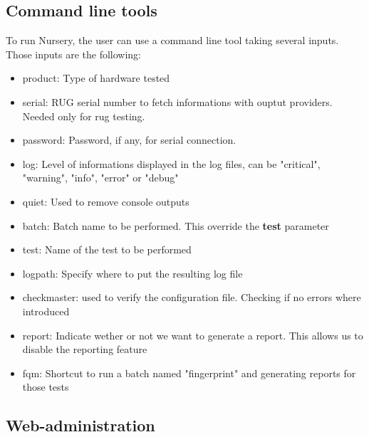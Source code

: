 \documentclass[12pt]{article}
\begin{document}
\subsection{Command line tools}

To run Nursery, the user can use a command line tool taking several inputs. Those inputs are the following:

\begin{itemize}
\item product: Type of hardware tested
\item serial: RUG serial number to fetch informations with ouptut providers. Needed only for \gls{rug} testing.
\item password: Password, if any, for serial connection.
\item log: Level of informations displayed in the log files, can be "critical", "warning", "info", "error" or "debug"
\item quiet: Used to remove console outputs
\item batch: Batch name to be performed. This override the \textbf{test} parameter
\item test: Name of the test to be performed
\item logpath: Specify where to put the resulting log file
\item checkmaster: used to verify the configuration file. Checking if no errors where introduced
\item report: Indicate wether or not we want to generate a report. This allows us to disable the reporting feature
\item fqm: Shortcut to run a batch named "fingerprint" and generating reports for those tests
\end{itemize}

\subsection{Web-administration}
\end{document}
